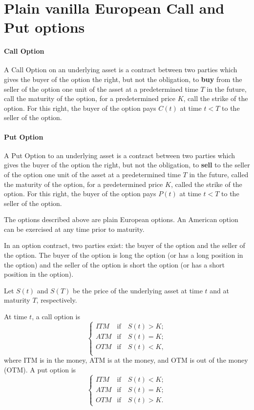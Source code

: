 \section{Plain vanilla European Call and Put options}
\paragraph{Call Option}
A Call Option on an underlying asset is a contract between two parties which
    gives the buyer of the option the right, but not the obligation, to
    \textbf{buy} from the seller of the option one unit of the asset at a
    predetermined time $ T $ in the future, call the maturity of the option, for
    a predetermined price $ K $, call the strike of the option.
For this right, the buyer of the option pays $ C(t) $ at time $ t < T $ to the
    seller of the option.

\paragraph{Put Option}
A Put Option to an underlying asset is a contract between two parties which
    gives the buyer of the option the right, but not the obligation, to
    \textbf{sell} to the seller of the option one unit of the asset at a
    predetermined time $ T $ in the future, called the maturity of the option,
    for a predetermined price $ K $, called the strike of the option.
For this right, the buyer of the option pays $ P(t) $ at time $ t < T $ to the
    seller of the option.

The options described above are plain European options.
An American option can be exercised at any time prior to maturity.

In an option contract, two parties exist: the buyer of the option and the seller
    of the option.
The buyer of the option is long the option (or has a long position in the
    option) and the seller of the option is short the option (or has a short
    position in the option).

Let $ S(t) $ and $ S(T) $ be the price of the underlying asset at time $ t $ and
    at maturity $ T $, respectively.

At time $ t $, a call option is
\begin{equation*}
    \begin{cases}
        ITM & \text{if} \quad S(t) > K; \\
        ATM & \text{if} \quad S(t) = K; \\
        OTM & \text{if} \quad S(t) < K, \\
    \end{cases}
\end{equation*}
where ITM is in the money, ATM is at the money, and OTM is out of the money
    (OTM).
A put option is
\begin{equation*}
    \begin{cases}
        ITM & \text{if} \quad S(t) < K; \\
        ATM & \text{if} \quad S(t) = K; \\
        OTM & \text{if} \quad S(t) > K.
    \end{cases}
\end{equation*}

